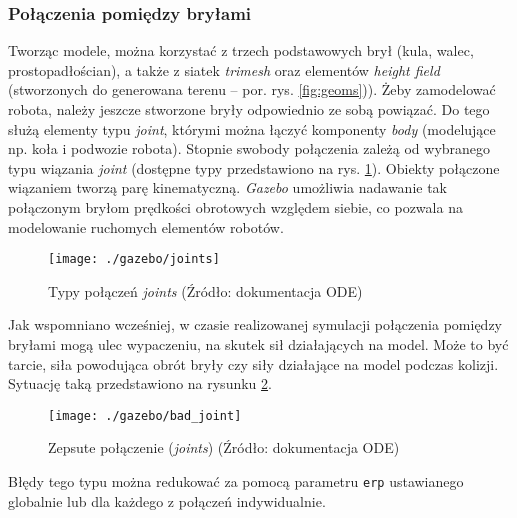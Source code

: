 	
	\subsubsection{Połączenia pomiędzy bryłami }
	Tworząc modele, można korzystać z trzech podstawowych brył (kula, walec, prostopadłościan), a także z siatek \textit{trimesh} oraz elementów \textit{height field} (stworzonych do generowana terenu -- por. rys. \ref{fig:geoms})).
	Żeby zamodelować robota, należy jeszcze stworzone bryły odpowiednio ze sobą powiązać. Do tego służą elementy typu \textit{joint}, którymi można łączyć komponenty \textit{body} (modelujące np. koła i podwozie robota).
	Stopnie swobody połączenia zależą od wybranego typu wiązania \textit{joint} (dostępne typy przedstawiono na rys. \ref{fig:joints}). Obiekty połączone wiązaniem tworzą parę kinematyczną.
	\textit{Gazebo} umożliwia nadawanie tak połączonym bryłom prędkości obrotowych względem siebie, co pozwala na modelowanie ruchomych elementów robotów.
	\begin{figure}[H]
	\centering
	\texttt{[image: ./gazebo/joints]}
	\caption{Typy połączeń \textit{joints} (Źródło: dokumentacja ODE) \label{fig:joints}}
	\end{figure}
	Jak wspomniano wcześniej, w czasie realizowanej symulacji połączenia pomiędzy bryłami mogą ulec wypaczeniu, na skutek sił działających na model. Może to być tarcie,
	siła powodująca obrót bryły czy siły działające na model podczas kolizji. Sytuację taką przedstawiono na rysunku \ref{fig:bad_joint}.
	\begin{figure}[H]
	\centering
	\texttt{[image: ./gazebo/bad\_joint]}
	\caption{Zepsute połączenie (\textit{joints}) (Źródło: dokumentacja ODE) \label{fig:bad_joint}}
	\end{figure}
	Błędy tego typu można redukować za pomocą parametru \texttt{erp} ustawianego globalnie lub dla każdego z połączeń indywidualnie.
